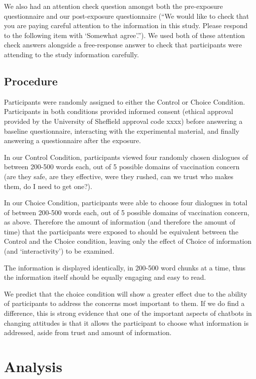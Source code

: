 \documentclass[
  english,
  ,jou,floatsintext]{apa6}
\begin{document}
We also had an attention check question amongst both the pre-exposure questionnaire and our post-exposure questionnaire (``We would like to check that you are paying careful attention to the information in this study. Please respond to the following item with `Somewhat agree'.''). We used both of these attention check answers alongside a free-response answer to check that participants were attending to the study information carefully.

\hypertarget{procedure}{%
\subsection{Procedure}\label{procedure}}

Participants were randomly assigned to either the Control or Choice Condition. Participants in both conditions provided informed consent (ethical approval provided by the University of Sheffield approval code xxxx) before answering a baseline questionnaire, interacting with the experimental material, and finally answering a questionnaire after the exposure.

In our Control Condition, participants viewed four randomly chosen dialogues of between 200-500 words each, out of 5 possible domains of vaccination concern (are they safe, are they effective, were they rushed, can we trust who makes them, do I need to get one?).

In our Choice Condition, participants were able to choose four dialogues in total of between 200-500 words each, out of 5 possible domains of vaccination concern, as above. Therefore the amount of information (and therefore the amount of time) that the participants were exposed to should be equivalent between the Control and the Choice condition, leaving only the effect of Choice of information (and `interactivity') to be examined.

The information is displayed identically, in 200-500 word chunks at a time, thus the information itself should be equally engaging and easy to read.

We predict that the choice condition will show a greater effect due to the ability of participants to address the concerns most important to them. If we do find a difference, this is strong evidence that one of the important aspects of chatbots in changing attitudes is that it allows the participant to choose what information is addressed, aside from trust and amount of information.

\hypertarget{analysis}{%
\section{Analysis}\label{analysis}}
\end{document}
